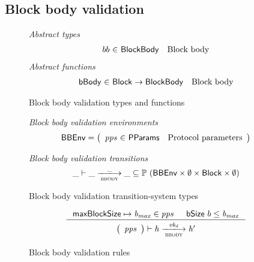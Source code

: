 \documentclass[11pt,a4paper]{article}
\newcommand{\powerset}[1]{\mathbb{P}~#1}
\newcommand{\var}[1]{\mathit{#1}}
\newcommand{\fun}[1]{\mathsf{#1}}
\newcommand{\type}[1]{\mathsf{#1}}
\newcommand{\trans}[2]{\xlongrightarrow[\textsc{#1}]{#2}}
\newcommand{\totalf}{\to}
\newcommand{\Block}{\type{Block}}
\newcommand{\ProtParams}{\type{PParams}} %
\newcommand{\bsizename}{bSize}
\newcommand{\bsize}[1]{\fun{\bsizename} ~ #1}
\begin{document}
\clearpage

\subsection{Block body validation}
\begin{figure}[ht]
  \emph{Abstract types}
  \begin{equation*}
    \begin{array}{r@{~\in~}lr}
    bb & \Bbody & \text{Block body}
    \end{array}
  \end{equation*}
  \emph{Abstract functions}
  \begin{equation*}
    \begin{array}{r@{~\in~}lr}
    \fun{\bbodyname} & \Block \totalf \Bbody & \text{Block body} \\
    \end{array}
  \end{equation*}
  \caption{Block body validation types and functions}
  \label{fig:defs:bbody}
\end{figure}

\begin{figure}[ht]
  \emph{Block body validation environments}
  \begin{equation*}
    \BBEnv =
    \left(
      \begin{array}{r@{~\in~}lr}
        \var{pps} & \ProtParams & \text{Protocol parameters} \\
      \end{array}
    \right)
  \end{equation*}

  \emph{Block body validation transitions}
  \begin{equation*}
    \_ \vdash \var{\_} \trans{bbody}{\_} \var{\_} \subseteq
    \powerset (\BBEnv \times \emptyset \times \Block \times \emptyset)
  \end{equation*}
  \caption{Block body validation transition-system types}
  \label{fig:ts-types:bbody}
\end{figure}

\begin{figure}[ht]
  \begin{equation*}
    \inference
    { \maxblocksize \mapsto \var{b_{max}} \in \var{pps} && \bsize{b} \leq \var{b_{max}} \\
    }
    {
      \left(
        {\begin{array}{c}
          \var{pps} \\
        \end{array}}
      \right)
      \vdash
        {\var{h}}
      \trans{bbody}{\var{vk_d}}
        {\var{h'}}
    }
  \end{equation*}
  \caption{Block body validation rules}
  \label{fig:rules:bbody}
\end{figure}
\end{document}
